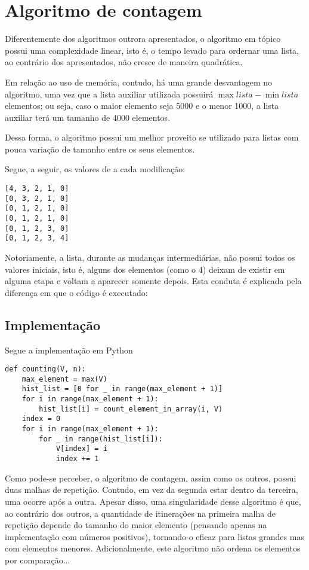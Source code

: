 \section{Algoritmo de contagem}
Diferentemente dos algoritmos outrora apresentados, o algoritmo em tópico possui uma complexidade linear, isto é, o tempo levado para ordernar uma lista, ao contrário dos apresentados, não cresce de maneira quadrática. 

Em relação ao uso de memória, contudo, há uma grande desvantagem no algoritmo, uma vez que a lista auxiliar utilizada possuirá $\max{lista}-\min{lista} $ elementos; ou seja, caso o maior elemento seja 5000 e o menor 1000, a lista auxiliar terá um tamanho de 4000 elementos.

Dessa forma, o algoritmo possui um melhor proveito se utilizado para listas com pouca variação de tamanho entre os seus elementos.

Segue, a seguir, os valores de  a cada modificação:
\begin{lstlisting}
[4, 3, 2, 1, 0]
[0, 3, 2, 1, 0]
[0, 1, 2, 1, 0]
[0, 1, 2, 1, 0]
[0, 1, 2, 3, 0]
[0, 1, 2, 3, 4]
\end{lstlisting}

Notoriamente, a lista, durante as mudanças intermediárias, não possui todos os valores iniciais, isto é, alguns dos elementos (como o 4) deixam de existir em alguma etapa e voltam a aparecer somente depois. Esta conduta é explicada pela diferença em que o código é executado: 

\subsection*{Implementação}
Segue a implementação em Python

\begin{lstlisting}
def counting(V, n):
    max_element = max(V)
    hist_list = [0 for _ in range(max_element + 1)]
    for i in range(max_element + 1):
        hist_list[i] = count_element_in_array(i, V)
    index = 0
    for i in range(max_element + 1):
        for _ in range(hist_list[i]):
            V[index] = i
            index += 1
\end{lstlisting}
Como pode-se perceber, o algoritmo de contagem, assim como os outros, possui duas malhas de repetição. Contudo, em vez da segunda estar dentro da terceira, uma ocorre após a outra.
Apesar disso, uma singularidade desse algoritmo é que, ao contrário dos outros, a quantidade de itinerações na primeira malha de repetição depende do tamanho do maior elemento (pensando apenas na implementação com números positivos), tornando-o eficaz para listas grandes mas com elementos menores.
Adicionalmente, este algoritmo não ordena os elementos por comparação...
